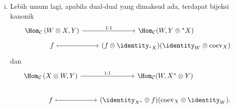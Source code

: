 \begin{proposition}
\begin{enumerate}[(i)]
		\begin{equation*}\begin{aligned}
			\begin{tikzpicture}[baseline=(M)]
				\node (A) {$X$};
				\node (B) [below=of A]{$Y$};
				\path (A) edge[->] node[midway, draw, fill=white] {$f$} (B);
				\coordinate (M) at ($(A)!.5!(B)$);
			\end{tikzpicture}
			& \; \longmapsto \; \begin{tikzpicture}[baseline=(B), bend angle=70]
				\node (A) {$X$};
				\node (B) [left=of A] {$X^*$};
				\node (C) [below=of A] {$Y$};
				\node (D) [below=of B] {$X^*$};
				\path (B) edge[bend left] node[auto] {$\mathrm{coev}_X$} (A);
				\path (A) edge[->] node[midway, draw, fill=white] {$f$} (C);
				\path (B) edge (D);
			\end{tikzpicture}
			\\
			\begin{tikzpicture}[baseline=(D), bend angle=70]
				\node (B) {$X$};
				\node (C) [right=of B] {$X^*$};
				\node (D) [right=of C] {$Y$};
				\node (A) [below=of D] {$Y$};
				\path (D) edge[->] (A);
				\path (B) edge[bend right] node[auto] {$\mathrm{ev}_X$} (C);
				\path (C) edge[bend left] node[midway, draw, fill=white] {$\varphi$} (D);
			\end{tikzpicture}
			& \; \longmapsfrom \;
			\begin{tikzpicture}[baseline=(A), bend angle=70]
				\node (A) {$X^*$};
				\node (B) [right=of A] {$Y$};
				\path (A) edge[bend left] node[midway, draw, fill=white] {$\varphi$} (B);
			\end{tikzpicture}
		\end{aligned}\end{equation*}
		\item Lebih umum lagi, apabila dual-dual yang dimaksud ada, terdapat bijeksi kanonik
		\[\begin{tikzcd}[row sep=tiny]
			\Hom_{\mathcal{C}}\left( W \otimes X, Y \right) \arrow[r, "1:1"] & \Hom_{\mathcal{C}}(W, Y \otimes {}^* X) \\
			f \arrow[mapsto, r] & (f \otimes \identity_{{}^* X}) (\identity_W \otimes \mathrm{coev}_X)
		\end{tikzcd}\]
		dan
		\[\begin{tikzcd}
			\Hom_{\mathcal{C}}\left( X \otimes W, Y \right) \arrow[r, "1:1"] & \Hom_{\mathcal{C}}(W, X^* \otimes Y) \\
			f \arrow[mapsto, r] & (\identity_{X^*} \otimes f) (\mathrm{coev}_X \otimes \identity_W).
		\end{tikzcd}\]
	\end{enumerate}
\end{proposition}
